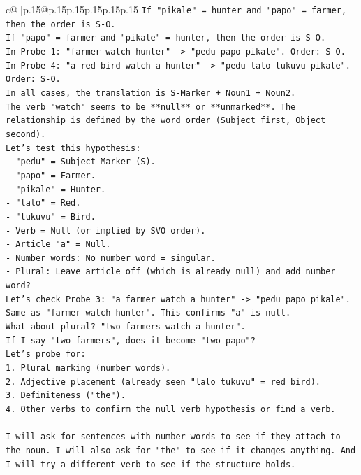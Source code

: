 \documentclass{article}
\begin{document}
{\begin{supertabular}{c@{$\;$}|p{.15\linewidth}@{}p{.15\linewidth}p{.15\linewidth}p{.15\linewidth}p{.15\linewidth}p{.15\linewidth}}
{{{\texttt{If "pikale" = hunter and "papo" = farmer, then the order is S{-}O.} \\
\texttt{If "papo" = farmer and "pikale" = hunter, then the order is S{-}O.} \\
\texttt{In Probe 1: "farmer watch hunter" {-}> "pedu papo pikale". Order: S{-}O.} \\
\texttt{In Probe 4: "a red bird watch a hunter" {-}> "pedu lalo tukuvu pikale". Order: S{-}O.} \\
\texttt{In all cases, the translation is S{-}Marker + Noun1 + Noun2.} \\
\texttt{The verb "watch" seems to be **null** or **unmarked**. The relationship is defined by the word order (Subject first, Object second).} \\
\texttt{Let's test this hypothesis:} \\
\texttt{{-} "pedu" = Subject Marker (S).} \\
\texttt{{-} "papo" = Farmer.} \\
\texttt{{-} "pikale" = Hunter.} \\
\texttt{{-} "lalo" = Red.} \\
\texttt{{-} "tukuvu" = Bird.} \\
\texttt{{-} Verb = Null (or implied by SVO order).} \\
\texttt{{-} Article "a" = Null.} \\
\texttt{{-} Number words: No number word = singular.} \\
\texttt{{-} Plural: Leave article off (which is already null) and add number word?} \\
\texttt{Let's check Probe 3: "a farmer watch a hunter" {-}> "pedu papo pikale". Same as "farmer watch hunter". This confirms "a" is null.} \\
\texttt{What about plural? "two farmers watch a hunter".} \\
\texttt{If I say "two farmers", does it become "two papo"?} \\
\texttt{Let's probe for:} \\
\texttt{1. Plural marking (number words).} \\
\texttt{2. Adjective placement (already seen "lalo tukuvu" = red bird).} \\
\texttt{3. Definiteness ("the").} \\
\texttt{4. Other verbs to confirm the null verb hypothesis or find a verb.} \\
\\ 
\texttt{I will ask for sentences with number words to see if they attach to the noun. I will also ask for "the" to see if it changes anything. And I will try a different verb to see if the structure holds.} \\
}}}
\end{supertabular}}
\end{document}
